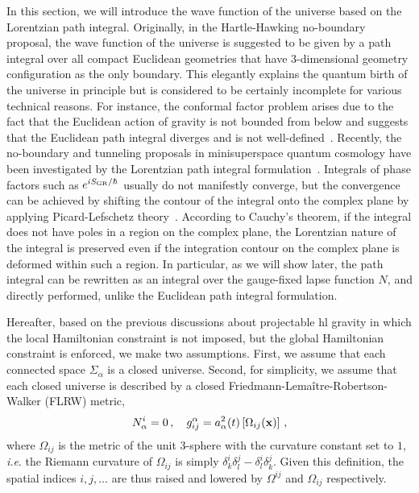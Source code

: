 \documentclass[superscriptaddress,aps,preprintnumbers,nofootinbib]{revtex4-2}
\begin{document}
In this section, we will introduce the wave function of the universe based on the Lorentzian path integral. Originally, in the Hartle-Hawking no-boundary proposal, the wave function of the universe is suggested to be given by a path integral over all compact Euclidean geometries that have $3$-dimensional geometry configuration as the only boundary. This elegantly explains the quantum birth of the universe in principle but is considered to be certainly incomplete for various technical reasons. For instance, the conformal factor problem arises due to the fact that the Euclidean action of gravity is not bounded from below and suggests that the Euclidean path integral diverges and is not well-defined~\cite{Gibbons:1978ac}. Recently, the no-boundary and tunneling proposals in minisuperspace quantum cosmology have been investigated by the Lorentzian path integral formulation~\cite{Feldbrugge:2017kzv,DiazDorronsoro:2017hti}. Integrals of phase factors such as $e^{i S_{\rm GR}/\hbar}$ usually do not manifestly converge, but the convergence can be achieved by shifting the contour of the integral onto the complex plane by applying Picard-Lefschetz theory~\cite{Witten:2010cx}. According to Cauchy's theorem, if the integral does not have poles in a region on the complex plane, the Lorentzian nature of the integral is preserved even if the integration contour on the complex plane is deformed within such a region. In particular, as we will show later, the path integral can be rewritten as an integral over the gauge-fixed lapse function $N$, and directly performed, unlike the Euclidean path integral formulation.



Hereafter, based on the previous discussions about projectable \ac{hl} gravity in which the local Hamiltonian constraint is not imposed, but the global Hamiltonian constraint is enforced, we make two assumptions. First, we assume that each connected space $\Sigma_{\alpha}$ is a closed universe. Second, for simplicity, we assume that each closed universe is described by a closed Friedmann-Lema\^{i}tre-Robertson-Walker (FLRW) metric, 
\begin{equation}
    N_{\alpha}^i = 0\,, \quad g^{\alpha}_{ij} = a^2_{\alpha}(t) \left[\Omega_{ij} ({\bf x}) \right]\,,
\end{equation}
where $\Omega_{ij}$ is the metric of the unit $3$-sphere with the curvature constant set to $1$, \textit{i.e}. the Riemann curvature of $\Omega_{ij}$ is simply $\delta^i_k\delta^j_l-\delta^i_l\delta^j_k$. Given this definition, the spatial indices $i, j, \dots$ are thus raised and lowered by $\Omega^{ij}$ and $\Omega_{ij}$ respectively. 
\end{document}
